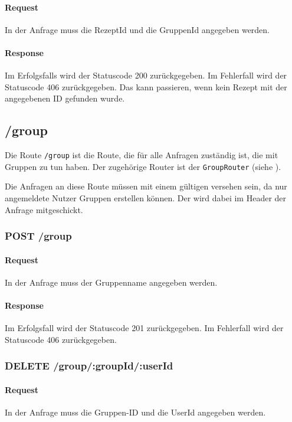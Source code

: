 \documentclass{entwurfsheft}
\begin{document}
\begin{sloppypar}
    \paragraph{Request}
        In der Anfrage muss die RezeptId und die GruppenId angegeben werden.
    \paragraph{Response}
        Im Erfolgsfalls wird der Statuscode 200 zurückgegeben.
        Im Fehlerfall wird der Statuscode 406 zurückgegeben. Das kann passieren, wenn kein Rezept mit der angegebenen ID gefunden wurde.

\subsection{/group}
Die Route \texttt{/group} ist die Route, die für alle Anfragen zuständig ist, die mit Gruppen zu tun haben.
Der zugehörige Router ist der \texttt{GroupRouter} (siehe ).

Die Anfragen an diese Route müssen mit einem gültigen  versehen sein, da nur angemeldete Nutzer Gruppen erstellen können.
Der  wird dabei im Header der Anfrage mitgeschickt.

\subsubsection*{POST /group}
    \paragraph{Request}
        In der Anfrage muss der Gruppenname angegeben werden.
    \paragraph{Response}
        Im Erfolgsfall wird der Statuscode 201 zurückgegeben. Im Fehlerfall wird der Statuscode 406 zurückgegeben. %
    
\subsubsection*{DELETE /group/:groupId/:userId}
    \paragraph{Request}
        In der Anfrage muss die Gruppen-ID und die UserId angegeben werden.

\end{sloppypar}
\end{document}
